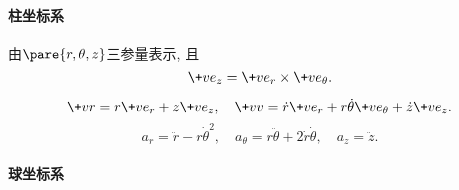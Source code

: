 \documentclass[../LectureNotes.tex]{subfiles}
\begin{document}

\paragraph{柱坐标系} %
\label{par:柱坐标系}

由$\pare{r,\theta,z}$三参量表示, 且
\[ \+ve_z = \+ve_r \times \+ve_\theta. \]
\begin{finale}
    \begin{theorem}
        \[ \+vr = r\+ve_r + z\+ve_z,\quad \+vv = \dot{r}\+ve_r + r\dot{\theta}\+ve_\theta + \dot{z}\+ve_z. \]
        \[ a_r = \ddot{r} - r\dot{\theta}^2,\quad a_\theta = r\ddot{\theta} + 2\dot{r}\dot{\theta},\quad a_z = \ddot{z}. \]
    \end{theorem}
\end{finale}


\paragraph{球坐标系} %
\label{par:球坐标系}
\end{document}

